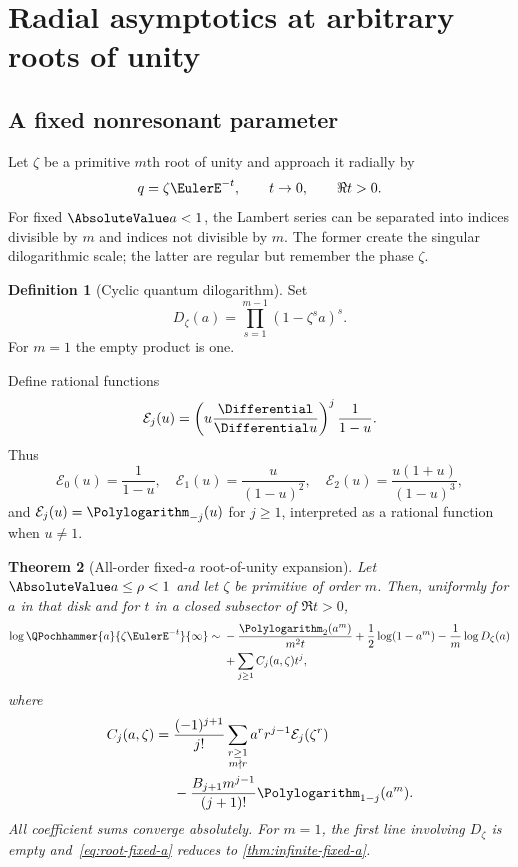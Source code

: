 \documentclass[11pt,oneside]{article}
\newtheorem{theorem}{Theorem}[section]
\theoremstyle{definition}
\newtheorem{definition}[theorem]{Definition}
\theoremstyle{remark}
\let\reporttopsection\section
\let\reportsubsection\subsection
\let\chapter\reporttopsection
\let\section\reportsubsection
\begin{document}
\chapter{Radial asymptotics at arbitrary roots of unity}\label{chap:root-radial}

\section{A fixed nonresonant parameter}

Let $\zeta$ be a primitive $m$th root of unity and approach it radially by
\[
 q=\zeta\EulerE^{-t},
 \qquad t\to0,
 \qquad \Re t>0.
\]
For fixed $\AbsoluteValue a<1$, the Lambert series can be separated into indices divisible
by $m$ and indices not divisible by $m$.  The former create the singular
dilogarithmic scale; the latter are regular but remember the phase $\zeta$.

\begin{definition}[Cyclic quantum dilogarithm]
Set
\begin{equation}\label{eq:cyclic-dilog}
 D_\zeta(a)=\prod_{s=1}^{m-1}(1-\zeta^s a)^s.
\end{equation}
For $m=1$ the empty product is one.
\end{definition}

Define rational functions
\begin{equation}\label{eq:eulerian-rational}
 \mathcal E_j(u)=
 \left(u\frac{\Differential}{\Differential u}\right)^j\frac1{1-u}.
\end{equation}
Thus
\[
 \mathcal E_0(u)=\frac1{1-u},
 \quad
 \mathcal E_1(u)=\frac{u}{(1-u)^2},
 \quad
 \mathcal E_2(u)=\frac{u(1+u)}{(1-u)^3},
\]
and $\mathcal E_j(u)=\Polylogarithm_{-j}(u)$ for $j\ge1$, interpreted as a rational
function when $u\ne1$.

\begin{theorem}[All-order fixed-$a$ root-of-unity expansion]
\label{thm:root-fixed-a}
Let $\AbsoluteValue a\le\rho<1$ and let $\zeta$ be primitive of order $m$.  Then, uniformly
for $a$ in that disk and for $t$ in a closed subsector of $\Re t>0$,
\begin{align}
 \log\QPochhammer{a}{\zeta\EulerE^{-t}}{\infty}
 \sim{}&-\frac{\Polylogarithm_2(a^m)}{m^2t}
 +\frac12\log(1-a^m)-\frac1m\log D_\zeta(a)
 \notag\\
 &+\sum_{j\ge1}C_j(a,\zeta)t^j,                  \label{eq:root-fixed-a}
\end{align}
where
\begin{align}
 C_j(a,\zeta)
 ={}&\frac{(-1)^{j+1}}{j!}
 \sum_{\substack{r\ge1\\m\nmid r}}
 a^r r^{j-1}\mathcal E_j(\zeta^r)
 \notag\\
 &-\frac{B_{j+1}m^{j-1}}{(j+1)!}
 \Polylogarithm_{1-j}(a^m).                                  \label{eq:root-Cj}
\end{align}
All coefficient sums converge absolutely.  For $m=1$, the first line involving
$D_\zeta$ is empty and~\eqref{eq:root-fixed-a} reduces to
\cref{thm:infinite-fixed-a}.
\end{theorem}
\end{document}
